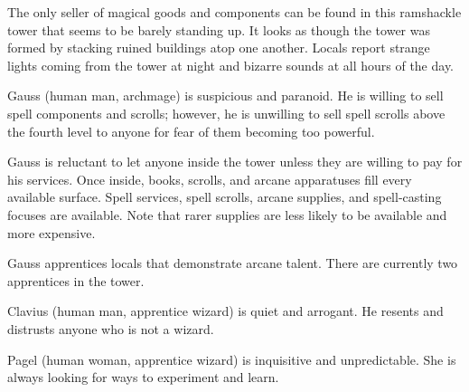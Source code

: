 The only seller of magical goods and components can be found in this ramshackle tower that seems to be barely standing up.
It looks as though the tower was formed by stacking ruined buildings atop one another.
Locals report strange lights coming from the tower at night and bizarre sounds at all hours of the day.

Gauss (human man, archmage) is suspicious and paranoid.
He is willing to sell spell components and scrolls; however, he is unwilling to sell spell scrolls above the fourth level to anyone for fear of them becoming too powerful.

Gauss is reluctant to let anyone inside the tower unless they are willing to pay for his services.
Once inside, books, scrolls, and arcane apparatuses fill every available surface.
Spell services, spell scrolls, arcane supplies, and spell-casting focuses are available.
Note that rarer supplies are less likely to be available and more expensive.

Gauss apprentices locals that demonstrate arcane talent.
There are currently two apprentices in the tower.

Clavius (human man, apprentice wizard) is quiet and arrogant.
He resents and distrusts anyone who is not a wizard.

Pagel (human woman, apprentice wizard) is inquisitive and unpredictable.
She is always looking for ways to experiment and learn.
